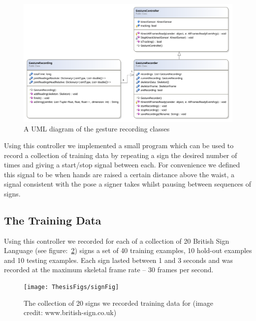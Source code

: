 \begin{figure}[t]
        \centering
        \includegraphics[width = 1.05\textwidth]{ThesisFigs/gestRecDiag}
        \caption{A UML diagram of the gesture recording classes}\label{fig:umlgest}
\end{figure}

Using this controller we implemented a small program which can be used to record a collection of training data by repeating a sign the desired number of times and giving a start/stop signal between each. For convenience we defined this signal to be when hands are raised a certain distance above the waist, a signal consistent with the pose a signer takes whilst pausing between sequences of signs.
 
\subsection{The Training Data}
Using this controller we recorded for each of a collection of 20 British Sign Language (see figure:~\ref{fig:signfig}) signs a set of 40 training examples, 10 hold-out examples and 10 testing examples. Each sign lasted between 1 and 3 seconds and was recorded at the maximum skeletal frame rate -- 30 frames per second.

\begin{figure}[t]
        \centering
        \texttt{[image: ThesisFigs/signFig]}
        \caption{The collection of 20 signs we recorded training data for (image credit: www.british-sign.co.uk)}\label{fig:signfig}
\end{figure}


